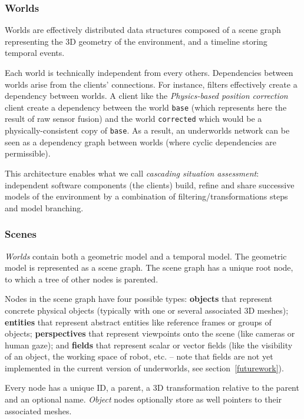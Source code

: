 \documentclass[letterpaper, 10 pt, conference]{ieeeconf}  %
\newcommand{\uwds}{{\sc underworlds}\xspace}
\begin{document}
\subsubsection{Worlds}

Worlds are effectively distributed data structures composed of a scene graph
representing the 3D geometry of the environment, and a timeline storing temporal
events.

Each world is technically independent from every others. Dependencies between
worlds arise from the clients' connections. For instance, filters effectively
create a dependency between worlds. A client like the \textit{Physics-based
position correction} client create a dependency between the world {\tt base} (which
represents here the result of raw sensor fusion) and the world {\tt corrected}
which would be a physically-consistent copy of {\tt base}.
As a result, an \uwds network can be seen as a dependency graph between worlds (where
cyclic dependencies are permissible).

This architecture enables what we call \emph{cascading situation assessment}:
independent software components (the clients) build, refine and share successive
models of the environment by a combination of filtering/transformations steps
and model branching.

\subsubsection{Scenes}

\emph{Worlds} contain both a geometric model and a temporal model. The geometric
model is represented as a scene graph. The scene graph has a unique root node,
to which a tree of other nodes is parented.

Nodes in the scene graph have four possible types: \textbf{objects} that represent
concrete physical objects (typically with one or several associated 3D meshes);
\textbf{entities} that represent abstract entities like reference frames or
groups of objects; \textbf{perspectives} that represent viewpoints onto the
scene (like cameras or human gaze); and \textbf{fields} that represent scalar or
vector fields (like the visibility of an object, the working space of robot,
etc. -- note that fields are not yet implemented in the current version of
\uwds, see section~\ref{futurework}).

Every node has a unique ID, a parent, a 3D transformation relative to the parent
and an optional name. \emph{Object} nodes optionally store as well pointers to their
associated meshes.
\end{document}
